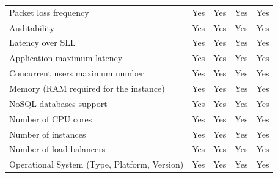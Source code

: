 \documentclass[conference]{IEEEtran}
\begin{document}
\begin{table}[]
\begin{tabular}{@{}lcccc@{}}
Packet loss frequency                    & Yes                                     & Yes                                     & Yes                                     & Yes                         \\
Auditability                           & Yes                                     & Yes                                     & Yes                                     & Yes                         \\
Latency over SLL                 & Yes                                     & Yes                                     & Yes                                     & Yes                         \\
Application maximum latency                       & Yes                                     & Yes                                     & Yes                                     & Yes                         \\
Concurrent users maximum number            & Yes                                     & Yes                                     & Yes                                     & Yes                         \\
Memory (RAM required for the instance)            & Yes                                     & Yes                                     & Yes                                     & Yes                         \\
NoSQL databases support                    & Yes                                     & Yes                                     & Yes                                     & Yes                         \\
Number of CPU cores                          & Yes                                     & Yes                                     & Yes                                     & Yes                         \\
Number of instances                               & Yes                                     & Yes                                     & Yes                                     & Yes                         \\
Number of load balancers                  & Yes                                     & Yes                                     & Yes                                     & Yes                         \\
Operational System (Type, Platform, Version)    & Yes                                     & Yes                                     & Yes                                     & Yes                         \\

\end{tabular}
\end{table}
\end{document}
